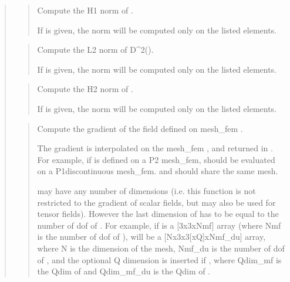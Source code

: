 \documentclass[a4paper,11pt,english]{sphinxmanual}
\begin{document}
\begin{quote}
\begin{quote}
\sphinxAtStartPar
Compute the H1 norm of .

\sphinxAtStartPar
If  is given, the norm will be computed only on the listed
elements.
\end{quote}

\sphinxAtStartPar
{}
\begin{quote}

\sphinxAtStartPar
Compute the L2 norm of D\textasciicircum{}2().

\sphinxAtStartPar
If  is given, the norm will be computed only on the listed
elements.
\end{quote}

\sphinxAtStartPar
{}
\begin{quote}

\sphinxAtStartPar
Compute the H2 norm of .

\sphinxAtStartPar
If  is given, the norm will be computed only on the listed
elements.
\end{quote}

\sphinxAtStartPar
{}
\begin{quote}

\sphinxAtStartPar
Compute the gradient of the field  defined on mesh\_fem .

\sphinxAtStartPar
The gradient is interpolated on the mesh\_fem , and returned in
. For example, if  is defined on a P2 mesh\_fem,  should be
evaluated on a P1\sphinxhyphen{}discontinuous mesh\_fem.  and  should
share the same mesh.

\sphinxAtStartPar
{} may have any number of dimensions (i.e. this function is not
restricted to the gradient of scalar fields, but may also be used
for tensor fields). However the last dimension of  has to be
equal to the number of dof of . For example, if  is a
{[}3x3xNmf{]} array (where Nmf is the number of dof of ),  will
be a {[}Nx3x3{[}xQ{]}xNmf\_du{]} array, where N is the dimension of the mesh,
Nmf\_du is the number of dof of , and the optional Q dimension
is inserted if , where Qdim\_mf is the Qdim of
 and Qdim\_mf\_du is the Qdim of .
\end{quote}


\end{quote}
\end{document}
